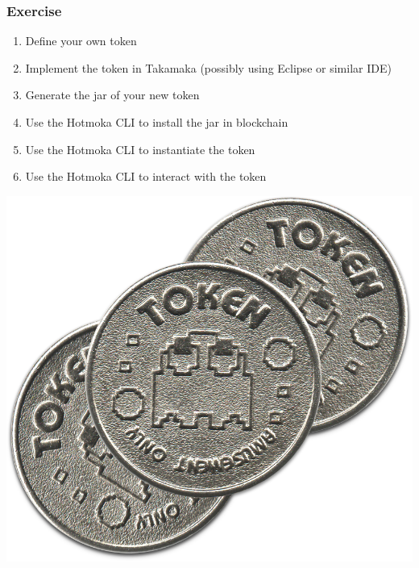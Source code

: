 \documentclass[11pt]{beamer}  %
\begin{document}
\begin{frame}\frametitle{Exercise}

  \begin{enumerate}
  \item Define your own token
  \item Implement the token in Takamaka (possibly using Eclipse or similar IDE)
  \item Generate the jar of your new token
  \item Use the Hotmoka CLI to install the jar in blockchain
  \item Use the Hotmoka CLI to instantiate the token
  \item Use the Hotmoka CLI to interact with the token
  \end{enumerate}

  \bigskip

  \begin{center}
    \includegraphics[scale=0.12,clip=false]{pictures/tokens.png}
  \end{center}

\end{frame}
\end{document}
